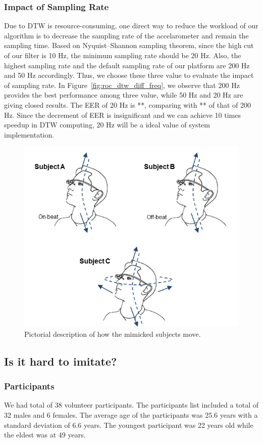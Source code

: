 \subsubsection{Impact of Sampling Rate}
Due to DTW is resource-consuming, one direct way to reduce the workload of our algorithm is to decrease the sampling rate of the accelarometer and remain the sampling time. Based on Nyquist–Shannon sampling theorem, since the high cut of our filter is 10 Hz, the minimum sampling rate should be 20 Hz. Also, the highest sampling rate and the default sampling rate of our platform are 200 Hz and 50 Hz accordingly. Thus, we choose these three value to evaluate the impact of sampling rate.  In Figure~\ref{fig:roc_dtw_diff_freq}, we observe that 200 Hz provides the best performance among three value, while 50 Hz and 20 Hz are giving closed results. The EER of 20 Hz is **, comparing with  ** of that of 200 Hz. Since the decrement of EER is insignificant and we can achieve 10 times speedup in DTW computing,  20 Hz will be a ideal value of system implementation.
\begin{figure}
\centering
\includegraphics[width = \columnwidth]{figure/imitation_subject_movement.png}
\caption{\label{fig:imitation_movement} Pictorial description of how the mimicked subjects move.}
\end{figure}
\subsection{Is it hard to imitate?}
\subsubsection{Participants}
We had total of 38 volunteer participants. The participants list included a total of 32 males and 6 females.
The average age of the participants was 25.6 years with a standard deviation
of 6.6 years. The youngest participant was 22 years old while the eldest was
at 49 years.
